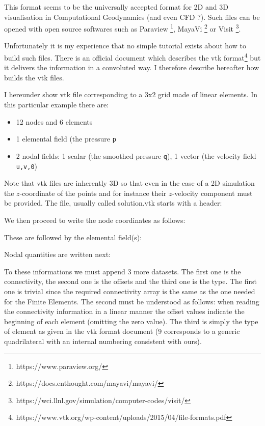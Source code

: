 
This format seems to be the universally accepted format for 2D and 3D visualisation in 
Computational Geodynamics (and even CFD ?). Such files can be opened with open source 
softwares such as 
Paraview \footnote{https://www.paraview.org/}, 
MayaVi \footnote{https://docs.enthought.com/mayavi/mayavi/}
or Visit \footnote{https://wci.llnl.gov/simulation/computer-codes/visit/}.

Unfortunately it is my experience that no simple tutorial exists about how to build 
such files. There is an official document which describes the vtk 
format\footnote{https://www.vtk.org/wp-content/uploads/2015/04/file-formats.pdf}
but it delivers the information in a convoluted way. I therefore describe hereafter 
how \fieldstone{} builds the vtk files. 

I hereunder show vtk file corresponding to a 3x2 grid made of linear elements.
In this particular example there are:
\begin{itemize}
\item 12 nodes and 6 elements
\item 1 elemental field (the pressure {\tt p}
\item 2 nodal fields: 1 scalar (the smoothed pressure {\tt q}), 1 vector (the velocity field {\tt u,v,0})
\end{itemize}
Note that vtk files are inherently 3D so that even in the case of a 2D simulation the $z$-coordinate 
of the points and for instance their $z$-velocity component must be provided.
The file, usually called {\filenamefont solution.vtk} starts with a header:



We then proceed to write the node coordinates as follows:



These are followed by the elemental field(s):



Nodal quantities are written next:



To these informations we must append 3 more datasets. The first one is the connectivity, 
the second one is the offsets and the third one is the type. The first one is trivial
since the required connectivity array is the same as the one needed for the Finite Elements. 
The second must be understood as follows:
when reading the connectivity information in a linear manner the offset values 
indicate the beginning of each element (omitting the zero value). The third is simply the type of element 
as given in the vtk format document (9 corresponds to a generic quadrilateral with an 
internal numbering consistent with ours). 

